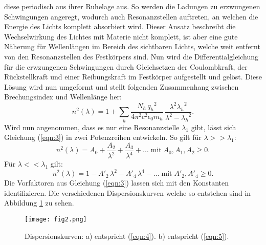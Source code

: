 diese periodisch aus ihrer Ruhelage aus. So werden die Ladungen zu erzwungenen Schwingungen angeregt, wodurch auch Resonanzstellen auftreten, an welchen
die Energie des Lichts komplett absorbiert wird. Dieser Ansatz beschreibt die Wechselwirkung des Lichtes mit Materie nicht komplett, ist aber eine gute
Näherung für Wellenlängen im Bereich des sichtbaren Lichts, welche weit entfernt von den Resonanzstellen des Festkörpers sind. Nun wird die Differentialgleichung
für die erwzungenen Schwingungen durch Gleichsetzen der Coulombkraft, der Rückstellkraft und einer Reibungskraft im Festkörper aufgestellt und gelöst. Diese Lösung
wird nun umgeformt und stellt folgenden Zusammenhang zwischen Brechungsindex und Wellenlänge her:
\begin{equation}
  n^2 (\lambda) = 1 + \sum_h \frac{N_h \, {q_h}^2}{4 {\pi}^2 c^2 {\epsilon}_0 m_h} \, \frac{{\lambda}^2 {{\lambda}_h}^2}{{\lambda}^2 - {{\lambda}_h}^2} .
  \label{eqn:3}
\end{equation}
Wird nun angenommen, dass es nur eine Resonanzstelle ${\lambda}_1$ gibt, lässt sich Gleichung (\ref{eqn:3}) in zwei Potenzreihen entwickeln. So gilt für
$\lambda >> {\lambda}_1$:
\begin{equation}
n^2 (\lambda) = A_0 + \frac{A_2}{{\lambda}^2} + \frac{A_3}{{\lambda}^4} + \ldots \; \text{mit} \; A_0 , A_1 , A_2 \geq 0 .
\label{eqn:4}
\end{equation}
Für $\lambda << {\lambda}_1$ gilt:
\begin{equation}
n^2 (\lambda) = 1 - {A'}_2 \, {\lambda}^2 - {A'}_4 \, {\lambda}^4 - \ldots \; \text{mit} \; {A'}_2 , {A'}_4 \geq 0 .
\label{eqn:5}
\end{equation}
Die Vorfaktoren aus Gleichung (\ref{eqn:3}) lassen sich mit den Konstanten identifizieren.
Die verschiedenen Dispersionskurven welche so entstehen sind in Abbildung \ref{fig:2} zu sehen.
\begin{figure}
  \centering
  \texttt{[image: fig2.png]}
  \caption{Dispersionskurven: a) entspricht (\ref{eqn:4}). b) entspricht (\ref{eqn:5}). \cite{1}}
  \label{fig:2}
\end{figure}
